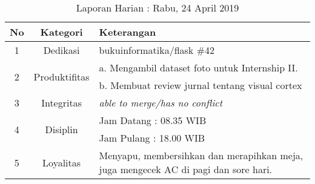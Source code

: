 \begin{table}[htp]
\begin{center}
\caption{Laporan Harian : Rabu, 24 April 2019}
\label{tab:lh240419}
\begin{tabularx}{\textwidth}{|l|l|X|}
\hline
\multicolumn{1}{|c|}{\textbf{No}} & \multicolumn{1}{c|}{\textbf{Kategori}} & \textbf{Keterangan} \\ \hline
\multicolumn{1}{|c|}{\multirow{1}{*}{1}} & \multicolumn{1}{c|}{\multirow{1}{*}{\parbox{2.5cm}{Dedikasi}}}
& bukuinformatika/flask \#42\\
\hline
\multicolumn{1}{|c|}{\multirow{2}{*}{2}} & \multicolumn{1}{c|}{\multirow{2}{*}{\parbox{2.5cm}{Produktifitas}}}
& a. Mengambil dataset foto untuk Internship II.\\
\multicolumn{1}{|c|}{\multirow{1}{*}{}} & \multicolumn{1}{c|}{\multirow{1}{*}{\parbox{2.5cm}{}}}
& b. Membuat review jurnal tentang visual cortex\\
\hline
\multicolumn{1}{|c|}{\multirow{1}{*}{3}} & \multicolumn{1}{c|}{\multirow{1}{*}{\parbox{2.5cm}{Integritas}}}
& \textit{able to merge/has no conflict} \\
\hline
\multicolumn{1}{|c|}{\multirow{2}{*}{4}} & \multicolumn{1}{c|}{\multirow{2}{*}{\parbox{2.5cm}{Disiplin}}}
& Jam Datang : 08.35 WIB \\
\multicolumn{1}{|c|}{\multirow{1}{*}{}} & \multicolumn{1}{c|}{\multirow{1}{*}{\parbox{2.5cm}{}}}
& Jam Pulang : 18.00 WIB \\
\hline
\multicolumn{1}{|c|}{\multirow{2}{*}{5}} & \multicolumn{1}{c|}{\multirow{2}{*}{\parbox{2.5cm}{Loyalitas}}}
& Menyapu, membersihkan dan merapihkan meja, juga mengecek AC di pagi dan sore hari.\\
\hline
\end{tabularx}
\end{center}
\end{table}

